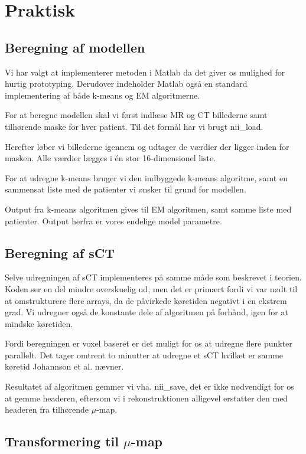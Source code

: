 \section{Praktisk}

\subsection{Beregning af modellen}

Vi har valgt at implementerer metoden i Matlab da det giver os mulighed for hurtig prototyping. Derudover indeholder Matlab også en standard implementering af både k-means og EM algoritmerne.

For at beregne modellen skal vi først indlæse MR og CT billederne samt tilhørende maske for hver patient. Til det formål har vi brugt nii\_load. 

Herefter løber vi billederne igennem og udtager de værdier der ligger inden for masken. Alle værdier lægges i én stor 16-dimensionel liste.

For at udregne k-means bruger vi den indbyggede k-means algoritme, samt en sammensat liste med de patienter vi ønsker til grund for modellen.

Output fra k-means algoritmen gives til EM algoritmen, samt samme liste med patienter. Output herfra er vores endelige model parametre.

\subsection{Beregning af sCT}

Selve udregningen af sCT implementeres på samme måde som beskrevet i teorien. Koden ser en del mindre overskuelig ud, men det er primært fordi vi var nødt til at omstrukturere flere arrays, da de påvirkede køretiden negativt i en ekstrem grad. Vi udregner også de konstante dele af algoritmen på forhånd, igen for at mindske køretiden.

Fordi beregningen er voxel baseret er det muligt for os at udregne flere punkter parallelt. Det tager omtrent to minutter at udregne et sCT hvilket er samme køretid Johannson et al. nævner.

Resultatet af algoritmen gemmer vi vha. nii\_save, det er ikke nødvendigt for os at gemme headeren, eftersom vi i rekonstruktionen alligevel erstatter den med headeren fra tilhørende $\mu$-map.


\subsection{Transformering til $\mu$-map} 


